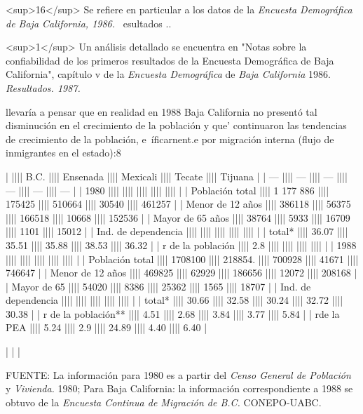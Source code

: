 \documentclass{article}
\begin{document}
<sup>16</sup> Se refiere en particular a los datos de la \textit{Encuesta Demográfica de Baja California, 1986.}  ~esultados ..

<sup>1</sup> Un análisis detallado se encuentra en "Notas sobre la confiabilidad de los primeros resultados de la Encuesta Demográfica de Baja California", capítulo v de la \textit{Encuesta Demográfica} de \textit{Baja California} 1986. \textit{Resultados. 1987.}

llevaría a pensar que en realidad en 1988 Baja California no presentó tal disminución en el crecimiento de la población y que' continuaron las tendencias de crecimiento de la población, e~íficarnent.e por migración interna (flujo de inmigrantes en el estado):8

|                     |||| B.C.      |||| Ensenada |||| Mexicali |||| Tecate |||| Tijuana |
| ---                 |||| ---       |||| ---      |||| ---      |||| ---    |||| ---     |
| 1980                ||||           ||||          ||||          ||||        ||||         |
| Población total     |||| 1 177 886 |||| 175425   |||| 510664   |||| 30540  |||| 461257  |
| Menor de 12 años    |||| 386118    |||| 56375    |||| 166518   |||| 10668  |||| 152536  |
| Mayor de 65 años    |||| 38764     |||| 5933     |||| 16709    |||| 1101   |||| 15012   |
| Ind. de dependencia ||||           ||||          ||||          ||||        ||||         |
| total*              |||| 36.07     |||| 35.51    |||| 35.88    |||| 38.53  |||| 36.32   |
| r de la población   |||| 2.8       ||||          ||||          ||||        ||||         |
| 1988                ||||           ||||          ||||          ||||        ||||         |
| Población total     |||| 1708100   |||| 218854.  |||| 700928   |||| 41671  |||| 746647  |
| Menor de 12 años    |||| 469825    |||| 62929    |||| 186656   |||| 12072  |||| 208168  |
| Mayor de 65         |||| 54020     |||| 8386     |||| 25362    |||| 1565   |||| 18707   |
| Ind. de dependencia ||||           ||||          ||||          ||||        ||||         |
| total*              |||| 30.66     |||| 32.58    |||| 30.24    |||| 32.72  |||| 30.38   |
| r de la población** |||| 4.51      |||| 2.68     |||| 3.84     |||| 3.77   |||| 5.84    |
| rde la PEA          |||| 5.24      |||| 2.9      |||| 24.89    |||| 4.40   |||| 6.40    |

|
|  |

FUENTE: La información para 1980 es a partir del \textit{Censo General de Población} y \textit{Vivienda.} 1980; Para Baja California: la información correspondiente a 1988 se obtuvo de la \textit{Encuesta Continua de Migración de B.C.} CONEPO-UABC.
\end{document}
